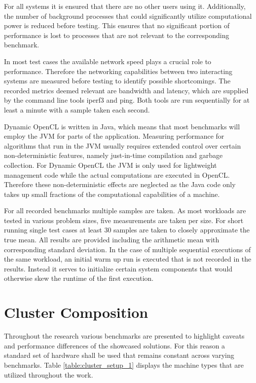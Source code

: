 For all systems it is ensured that there are no other users using it. Additionally, the number of background processes that could significantly utilize computational power is reduced before testing. This ensures that no significant portion of performance is lost to processes that are not relevant to the corresponding benchmark.

In most test cases the available network speed plays a crucial role to performance. Therefore the networking capabilities between two interacting systems are measured before testing to identify possible shortcomings. The recorded metrics deemed relevant are bandwidth and latency, which are supplied by the command line tools iperf3 and ping. Both tools are run sequentially for at least a minute with a sample taken each second.

Dynamic OpenCL is written in Java, which means that most benchmarks will employ the JVM for parts of the application. Measuring performance for algorithms that run in the JVM usually requires extended control over certain non-deterministic features, namely just-in-time compilation and garbage collection\cite{rigorous_java}. For Dynamic OpenCL the JVM is only used for lightweight management code while the actual computations are executed in OpenCL. Therefore these non-deterministic effects are neglected as the Java code only takes up small fractions of the computational capabilities of a machine.

For all recorded benchmarks multiple samples are taken. As most workloads are tested in various problem sizes, five measurements are taken per size. For short running single test cases at least 30 samples are taken to closely approximate the true mean\cite{measuring_computer_performance}. All results are provided including the arithmetic mean with corresponding standard deviation. In the case of multiple sequential executions of the same workload, an initial warm up run is executed that is not recorded in the results. Instead it serves to initialize certain system components that would otherwise skew the runtime of the first execution.

\section{Cluster Composition}
\label{cluster_composition}
Throughout the research various benchmarks are presented to highlight caveats and performance differences of the showcased solutions. For this reason a standard set of hardware shall be used that remains constant across varying benchmarks. Table \ref{table:cluster_setup_1} displays the machine types that are utilized throughout the work.

